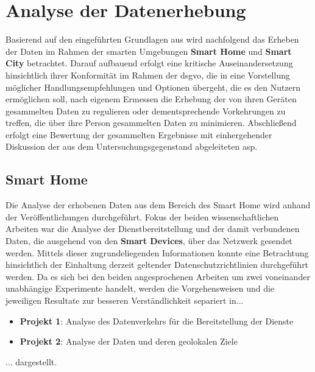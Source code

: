 
\section{Analyse der Datenerhebung}
\label{sec:Analyse der Datenerhebung}

Basierend auf den eingeführten Grundlagen aus  wird nachfolgend das Erheben der Daten im Rahmen der smarten Umgebungen \textbf{Smart Home} und \textbf{Smart City} betrachtet. Darauf aufbauend erfolgt eine kritische Auseinandersetzung hinsichtlich ihrer Konformität im Rahmen der \ac{dsgvo}, die in eine Vorstellung möglicher Handlungsempfehlungen und Optionen übergeht, 
die es den Nutzern ermöglichen soll, nach eigenem Ermessen die Erhebung der von ihren Geräten gesammelten Daten zu regulieren oder dementsprechende Vorkehrungen zu treffen, die über ihre Person gesammelten Daten zu minimieren. 
Abschließend erfolgt eine Bewertung der gesammelten Ergebnisse mit einhergehender Diskussion der aus dem Untersuchungsgegenstand abgeleiteten \acl{asp}. 

\subsection{Smart Home}
\label{sec:Analyse der Datenerhebung:ssec:Smart Home}

Die Analyse der erhobenen Daten aus dem Bereich des Smart Home wird anhand der Veröffentlichungen \cite{Mandalari2021,Ren2019} durchgeführt. Fokus der beiden wissenschaftlichen Arbeiten war die Analyse der Dienstbereitstellung und der damit verbundenen Daten, die ausgehend von den \textbf{Smart Devices}, über das Netzwerk gesendet werden. Mittels dieser zugrundeliegenden Informationen konnte eine Betrachtung hinsichtlich der Einhaltung derzeit geltender Datenschutzrichtlinien durchgeführt werden.
Da es sich bei den beiden angesprochenen Arbeiten um zwei voneinander unabhängige Experimente handelt, werden die Vorgehensweisen und die jeweiligen Resultate zur besseren Verständlichkeit separiert in...
\begin{itemize}
	\item \textbf{Projekt 1}: Analyse des Datenverkehrs für die Bereitstellung der Dienste
	\item \textbf{Projekt 2}: Analyse der Daten und deren geolokalen Ziele
\end{itemize}
\noindent ... dargestellt.

